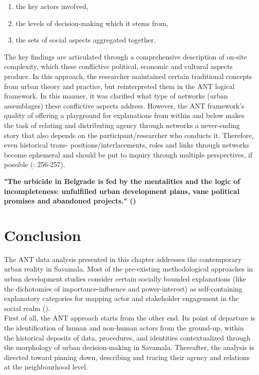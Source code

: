 \documentclass[11pt]{report}
\begin{document}
{{{{\begin{enumerate}
\item the key actors involved,
\item the levels of decision-making which it stems from,
\item the sets of social aspects aggregated together.
\end{enumerate}

The key findings are articulated through a comprehensive description of on-site complexity, which these conflictive political, economic and cultural aspects produce. In this approach, the researcher maintained certain traditional concepts from urban theory and practice, but reinterpreted them in the ANT logical framework. In this manner, it was clarified what type of networks (urban assemblages) these conflictive aspects address. However, the ANT framework’s quality of offering a playground for explanations from within and below makes the task of relating and distributing agency through networks a never-ending story that also depends on the participant/researcher who conducts it. Therefore, even historical trans- positions/interlacements, roles and links through networks become ephemeral and should be put to inquiry through multiple perspectives, if possible  (\href{Latour}{\citealt{latour_reassembling_2005}}: 256-257).

\textbf{"The  urbicide  in  Belgrade  is  fed  by  the  mentalities and  the  logic  of  incompleteness:  unfulfilled  urban development  plans,  vane  political  promises  and abandoned  projects." (\href{Doytchinov}{\citealt{doytchinov_belgrade_2015}})}

\section{Conclusion}

The ANT data analysis presented in this chapter addresses the contemporary urban reality in Savamala.
Most of the pre-existing methodological approaches in urban development studies consider certain socially bounded explanations (like the dichotomies of importance-influence and power-interest) as self-containing explanatory categories for mapping actor and stakeholder engagement in the social realm (\href{Mathur}{\citealt{mathur_defining_2007}}).
\\

First of all, the ANT approach starts from the other end.
Its point of departure is the identification of human and non-human actors from the ground-up, within the historical deposits of data, procedures, and identities contextualized through the morphology of urban decision-making in Savamala.
Thereafter, the analysis is directed toward pinning down, describing and tracing  their agency and relations at the neighbourhood level.
\\

}}}}
\end{document}
